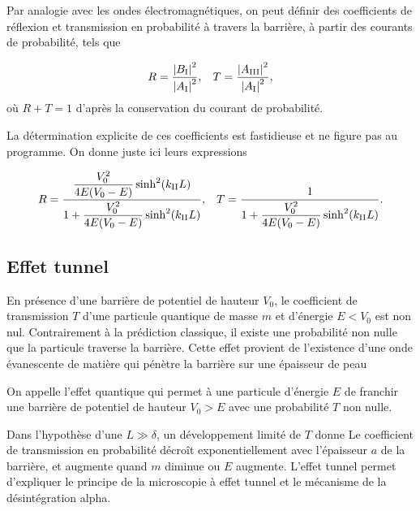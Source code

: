 \documentclass[12pt,fancy]{cours}
\begin{document}
Par analogie avec les ondes électromagnétiques, on peut définir des coefficients de réflexion et transmission en probabilité à travers la barrière, à partir des courants de probabilité, tels que
\begin{theorem}\label{form:}
  \begin{equation*}
  R=\frac{\left\vert B_\mathrm{I}\right\vert^2}{\left\vert A_\mathrm{I}\right\vert^2}, \hspace*{.3cm} T=\frac{\left\vert A_\mathrm{III}\right\vert^2}{\left\vert A_\mathrm{I}\right\vert^2},
\end{equation*}
  où $R+T=1$ d'après la conservation du courant de probabilité.
\end{theorem}
 La détermination explicite de ces coefficients est fastidieuse et ne figure pas au programme. On donne juste ici leurs expressions

\begin{equation}
R=\frac{\displaystyle\frac{V_0^2}{4E(V_0-E)}\sinh^2(k_\mathrm{II}L)}{\displaystyle 1+\frac{V_0^2}{4E(V_0-E)}\sinh^2(k_\mathrm{II}L)},\hspace*{0.3cm} T=\frac{1}{\displaystyle 1+\frac{V_0^2}{4E(V_0-E)}\sinh^2(k_\mathrm{II}L)}.
\end{equation}

\subsection{Effet tunnel}
En présence d'une barrière de potentiel de hauteur $V_0$, le coefficient de transmission $T$ d'une particule quantique de masse $m$ et d'énergie $E<V_0$ est non nul. Contrairement à la prédiction classique, il existe une probabilité non nulle que la particule traverse la barrière. Cette effet provient de l'existence d'une onde évanescente de matière qui pénètre la barrière sur une épaisseur de peau

\begin{definition}\label{def:}
  On appelle  l'effet quantique qui permet à une particule d'énergie $E$ de franchir une barrière de potentiel de hauteur $V_0>E$ avec une probabilité $T$ non nulle.
\end{definition}

Dans l'hypothèse d'une  $L\gg \delta$, un développement limité de $T$ donne
Le coefficient de transmission en probabilité décroît exponentiellement avec l'épaisseur $a$ de la barrière, et augmente quand $m$ diminue ou $E$ augmente. L'effet tunnel permet d'expliquer le principe de la microscopie à effet tunnel et le mécanisme de la désintégration alpha.
\end{document}
